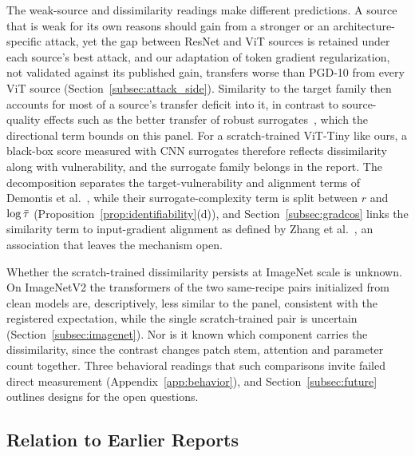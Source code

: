 The weak-source and dissimilarity readings make different predictions. A source that is weak for its own reasons should gain from a stronger or an architecture-specific attack, yet the gap between ResNet and ViT sources is retained under each source's best attack, and our adaptation of token gradient regularization, not validated against its published gain, transfers worse than PGD-10 from every ViT source (Section~\ref{subsec:attack_side}). Similarity to the target family then accounts for most of a source's transfer deficit into it, in contrast to source-quality effects such as the better transfer of robust surrogates~\cite{awad2025defense}, which the directional term bounds on this panel. For a scratch-trained ViT-Tiny like ours, a black-box score measured with CNN surrogates therefore reflects dissimilarity along with vulnerability, and the surrogate family belongs in the report. The decomposition separates the target-vulnerability and alignment terms of Demontis et al.~\cite{demontis2019adversarial}, while their surrogate-complexity term is split between $r$ and $\log\bar{\tau}$ (Proposition~\ref{prop:identifiability}(d)), and Section~\ref{subsec:gradcos} links the similarity term to input-gradient alignment as defined by Zhang et al.~\cite{zhang2024why}, an association that leaves the mechanism open.

Whether the scratch-trained dissimilarity persists at ImageNet scale is unknown. On ImageNetV2 the transformers of the two same-recipe pairs initialized from clean models are, descriptively, less similar to the panel, consistent with the registered expectation, while the single scratch-trained pair is uncertain (Section~\ref{subsec:imagenet}). Nor is it known which component carries the dissimilarity, since the contrast changes patch stem, attention and parameter count together. Three behavioral readings that such comparisons invite failed direct measurement (Appendix~\ref{app:behavior}), and Section~\ref{subsec:future} outlines designs for the open questions.

\subsection{Relation to Earlier Reports}
\label{subsec:prior}

